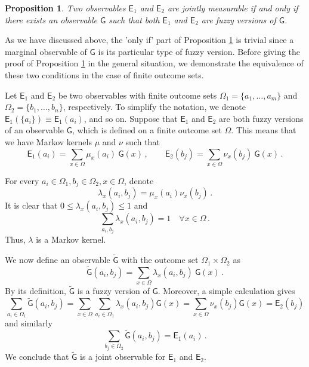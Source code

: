 \documentclass[12pt]{amsart}
\newtheorem{proposition}{Proposition}
\theoremstyle{definition}
\newcommand{\Eo}{\mathsf{E}} %
\newcommand{\Go}{\mathsf{G}} %
\begin{document}
\begin{proposition}\label{prop:joint-iff-fuzzy}
Two observables $\Eo_1$ and $\Eo_2$ are jointly measurable if and only if there exists an observable $\Go$ such that both $\Eo_1$ and $\Eo_2$ are fuzzy versions of $\Go$.
\end{proposition}

As we have discussed above, the 'only if' part of Proposition \ref{prop:joint-iff-fuzzy} is trivial since a marginal observable of $\Go$ is its particular type of fuzzy version. Before giving the proof of Proposition \ref{prop:joint-iff-fuzzy} in the general situation, we demonstrate the equivalence of these two conditions in the case of finite outcome sets.

Let $\Eo_1$ and $\Eo_2$ be two observables with finite outcome sets $\Omega_1=\{a_1,\ldots,a_m\}$ and $\Omega_2=\{b_1,\ldots,b_n\}$, respectively. To simplify the notation, we denote $\Eo_1(\{a_i\})\equiv \Eo_1(a_i)$, and so on. Suppose that $\Eo_1$ and $\Eo_2$ are both fuzzy versions of an observable $\Go$, which is defined on a finite outcome set $\Omega$. This means that we have Markov kernels $\mu$ and $\nu$ such that
\begin{equation*}
\Eo_1(a_i)=\sum_{x\in\Omega} \mu_{x}(a_i) \ \Go(x) \, , \qquad \Eo_2(b_j)=\sum_{x\in\Omega} \nu_{x}(b_j) \ \Go(x) \, .
\end{equation*}


For every $a_i\in\Omega_1,b_j\in\Omega_2,x\in\Omega$, denote
\begin{equation*}
\lambda_{x}(a_i,b_j)=\mu_{x}(a_i) \nu_{x}(b_j) \, .
\end{equation*}
It is clear that $0 \leq \lambda_{x}(a_i,b_j)\leq 1$ and
\begin{equation*}
\sum_{a_i,b_j} \lambda_{x}(a_i,b_j) = 1 \quad \forall x\in\Omega \, .
\end{equation*}
Thus, $\lambda$ is a Markov kernel.

We now define an observable $\widetilde{\Go}$ with the outcome set $\Omega_1\times\Omega_2$ as
\begin{equation*}
\widetilde{\Go}(a_i,b_j)=\sum_{x\in\Omega} \lambda_{x}(a_i,b_j) \ \Go(x) \, .
\end{equation*}
By its definition, $\widetilde{\Go}$ is a fuzzy version of $\Go$. Moreover, a simple calculation gives
\begin{equation*}
\sum_{a_i\in\Omega_1} \widetilde{\Go}(a_i,b_j) = \sum_{x\in\Omega} \sum_{a_i\in\Omega_1} \lambda_{x}(a_i,b_j) \Go(x) = \sum_{x\in\Omega} \nu_{x}(b_j) \Go(x)=\Eo_2(b_j)
\end{equation*}
and similarly
\begin{equation*}
\sum_{b_j\in\Omega_2} \widetilde{\Go}(a_i,b_j) =\Eo_1(a_i) \, .
\end{equation*}
We conclude that $\widetilde{\Go}$ is a joint observable for $\Eo_1$ and $\Eo_2$.
\end{document}
